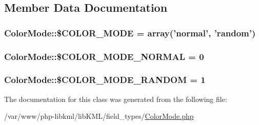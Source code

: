 \subsection{Member Data Documentation}
\hypertarget{classColorMode_a1022ad43521d4bee933f34845b0cd564}{
\subsubsection[{\$COLOR\_\-MODE}]{\setlength{\rightskip}{0pt plus 5cm}ColorMode::\$COLOR\_\-MODE = array('normal', 'random')}}
\label{dd/ddb/classColorMode_a1022ad43521d4bee933f34845b0cd564}
\hypertarget{classColorMode_a3e032493d1742989a92dfa3df5f28127}{
\subsubsection[{\$COLOR\_\-MODE\_\-NORMAL}]{\setlength{\rightskip}{0pt plus 5cm}ColorMode::\$COLOR\_\-MODE\_\-NORMAL = 0}}
\label{dd/ddb/classColorMode_a3e032493d1742989a92dfa3df5f28127}
\hypertarget{classColorMode_a78b67383edbb9de9301531fd83beda62}{
\subsubsection[{\$COLOR\_\-MODE\_\-RANDOM}]{\setlength{\rightskip}{0pt plus 5cm}ColorMode::\$COLOR\_\-MODE\_\-RANDOM = 1}}
\label{dd/ddb/classColorMode_a78b67383edbb9de9301531fd83beda62}


The documentation for this class was generated from the following file:\begin{DoxyCompactItemize}
\item 
/var/www/php-\/libkml/libKML/field\_\-types/\hyperlink{ColorMode_8php}{ColorMode.php}\end{DoxyCompactItemize}
